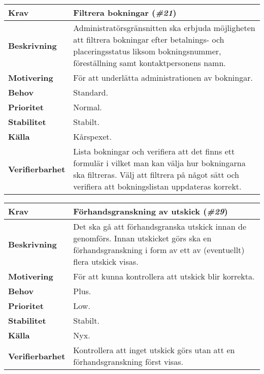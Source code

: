 \documentclass[a4paper, twoside, 11pt, titlepage]{article}
\begin{document}
		\begin{tabular} { p{2.6cm} p{12.5cm} }
			\hline
			\sffamily\textbf{Krav} & Filtrera bokningar (\emph{\#21})  \\
			\hline
			\sffamily\textbf{Beskrivning} & Administratörsgränsnitten ska erbjuda möjligheten att filtrera bokningar efter betalnings- och placeringsstatus liksom bokningsnummer, föreställning samt kontaktpersonens namn.  \\
			\hline
			\sffamily\textbf{Motivering} & För att underlätta administrationen av bokningar.  \\
			\hline
			\sffamily\textbf{Behov} & Standard.  \\
			\hline
			\sffamily\textbf{Prioritet} & Normal.  \\
			\hline
			\sffamily\textbf{Stabilitet} & Stabilt.  \\
			\hline
			\sffamily\textbf{Källa} & Kårspexet.  \\
			\hline
			\sffamily\textbf{Verifierbarhet} & Lista bokningar och verifiera att det finns ett formulär i vilket man kan välja hur bokningarna ska filtreras. Välj att filtrera på något sätt och verifiera att bokningslistan uppdateras korrekt.  \\
			\hline
		\end{tabular}
		\vspace{6mm}

		\begin{tabular} { p{2.6cm} p{12.5cm} }
			\hline
			\sffamily\textbf{Krav} & Förhandsgranskning av utskick (\emph{\#29})  \\
			\hline
			\sffamily\textbf{Beskrivning} & Det ska gå att förhandsgranska utskick innan de genomförs. Innan utskicket görs ska en förhandsgranskning i form av ett av (eventuellt) flera utskick visas.  \\
			\hline
			\sffamily\textbf{Motivering} & För att kunna kontrollera att utskick blir korrekta.  \\
			\hline
			\sffamily\textbf{Behov} & Plus.  \\
			\hline
			\sffamily\textbf{Prioritet} & Low.  \\
			\hline
			\sffamily\textbf{Stabilitet} & Stabilt.  \\
			\hline
			\sffamily\textbf{Källa} & Nyx.  \\
			\hline
			\sffamily\textbf{Verifierbarhet} & Kontrollera att inget utskick görs utan att en förhandsgranskning först visas.  \\
			\hline
		\end{tabular}
		\vspace{6mm}
\end{document}
